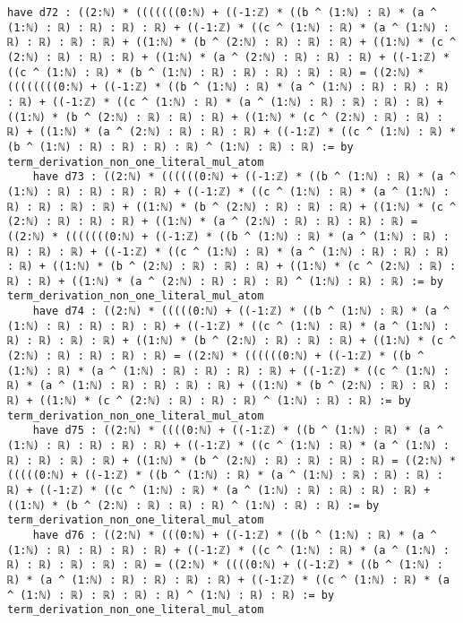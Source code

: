 \documentclass{article}
\begin{document}
\begin{tcolorbox}[colback=white!10, width=\linewidth]
\begin{lstlisting}[language=Lean4]
    have d72 : ((2:ℕ) * (((((((0:ℕ) + ((-1:ℤ) * ((b ^ (1:ℕ) : ℝ) * (a ^ (1:ℕ) : ℝ) : ℝ) : ℝ) : ℝ) + ((-1:ℤ) * ((c ^ (1:ℕ) : ℝ) * (a ^ (1:ℕ) : ℝ) : ℝ) : ℝ) : ℝ) + ((1:ℕ) * (b ^ (2:ℕ) : ℝ) : ℝ) : ℝ) + ((1:ℕ) * (c ^ (2:ℕ) : ℝ) : ℝ) : ℝ) + ((1:ℕ) * (a ^ (2:ℕ) : ℝ) : ℝ) : ℝ) + ((-1:ℤ) * ((c ^ (1:ℕ) : ℝ) * (b ^ (1:ℕ) : ℝ) : ℝ) : ℝ) : ℝ) : ℝ) = ((2:ℕ) * ((((((((0:ℕ) + ((-1:ℤ) * ((b ^ (1:ℕ) : ℝ) * (a ^ (1:ℕ) : ℝ) : ℝ) : ℝ) : ℝ) + ((-1:ℤ) * ((c ^ (1:ℕ) : ℝ) * (a ^ (1:ℕ) : ℝ) : ℝ) : ℝ) : ℝ) + ((1:ℕ) * (b ^ (2:ℕ) : ℝ) : ℝ) : ℝ) + ((1:ℕ) * (c ^ (2:ℕ) : ℝ) : ℝ) : ℝ) + ((1:ℕ) * (a ^ (2:ℕ) : ℝ) : ℝ) : ℝ) + ((-1:ℤ) * ((c ^ (1:ℕ) : ℝ) * (b ^ (1:ℕ) : ℝ) : ℝ) : ℝ) : ℝ) ^ (1:ℕ) : ℝ) : ℝ) := by term_derivation_non_one_literal_mul_atom
    have d73 : ((2:ℕ) * ((((((0:ℕ) + ((-1:ℤ) * ((b ^ (1:ℕ) : ℝ) * (a ^ (1:ℕ) : ℝ) : ℝ) : ℝ) : ℝ) + ((-1:ℤ) * ((c ^ (1:ℕ) : ℝ) * (a ^ (1:ℕ) : ℝ) : ℝ) : ℝ) : ℝ) + ((1:ℕ) * (b ^ (2:ℕ) : ℝ) : ℝ) : ℝ) + ((1:ℕ) * (c ^ (2:ℕ) : ℝ) : ℝ) : ℝ) + ((1:ℕ) * (a ^ (2:ℕ) : ℝ) : ℝ) : ℝ) : ℝ) = ((2:ℕ) * (((((((0:ℕ) + ((-1:ℤ) * ((b ^ (1:ℕ) : ℝ) * (a ^ (1:ℕ) : ℝ) : ℝ) : ℝ) : ℝ) + ((-1:ℤ) * ((c ^ (1:ℕ) : ℝ) * (a ^ (1:ℕ) : ℝ) : ℝ) : ℝ) : ℝ) + ((1:ℕ) * (b ^ (2:ℕ) : ℝ) : ℝ) : ℝ) + ((1:ℕ) * (c ^ (2:ℕ) : ℝ) : ℝ) : ℝ) + ((1:ℕ) * (a ^ (2:ℕ) : ℝ) : ℝ) : ℝ) ^ (1:ℕ) : ℝ) : ℝ) := by term_derivation_non_one_literal_mul_atom
    have d74 : ((2:ℕ) * (((((0:ℕ) + ((-1:ℤ) * ((b ^ (1:ℕ) : ℝ) * (a ^ (1:ℕ) : ℝ) : ℝ) : ℝ) : ℝ) + ((-1:ℤ) * ((c ^ (1:ℕ) : ℝ) * (a ^ (1:ℕ) : ℝ) : ℝ) : ℝ) : ℝ) + ((1:ℕ) * (b ^ (2:ℕ) : ℝ) : ℝ) : ℝ) + ((1:ℕ) * (c ^ (2:ℕ) : ℝ) : ℝ) : ℝ) : ℝ) = ((2:ℕ) * ((((((0:ℕ) + ((-1:ℤ) * ((b ^ (1:ℕ) : ℝ) * (a ^ (1:ℕ) : ℝ) : ℝ) : ℝ) : ℝ) + ((-1:ℤ) * ((c ^ (1:ℕ) : ℝ) * (a ^ (1:ℕ) : ℝ) : ℝ) : ℝ) : ℝ) + ((1:ℕ) * (b ^ (2:ℕ) : ℝ) : ℝ) : ℝ) + ((1:ℕ) * (c ^ (2:ℕ) : ℝ) : ℝ) : ℝ) ^ (1:ℕ) : ℝ) : ℝ) := by term_derivation_non_one_literal_mul_atom
    have d75 : ((2:ℕ) * ((((0:ℕ) + ((-1:ℤ) * ((b ^ (1:ℕ) : ℝ) * (a ^ (1:ℕ) : ℝ) : ℝ) : ℝ) : ℝ) + ((-1:ℤ) * ((c ^ (1:ℕ) : ℝ) * (a ^ (1:ℕ) : ℝ) : ℝ) : ℝ) : ℝ) + ((1:ℕ) * (b ^ (2:ℕ) : ℝ) : ℝ) : ℝ) : ℝ) = ((2:ℕ) * (((((0:ℕ) + ((-1:ℤ) * ((b ^ (1:ℕ) : ℝ) * (a ^ (1:ℕ) : ℝ) : ℝ) : ℝ) : ℝ) + ((-1:ℤ) * ((c ^ (1:ℕ) : ℝ) * (a ^ (1:ℕ) : ℝ) : ℝ) : ℝ) : ℝ) + ((1:ℕ) * (b ^ (2:ℕ) : ℝ) : ℝ) : ℝ) ^ (1:ℕ) : ℝ) : ℝ) := by term_derivation_non_one_literal_mul_atom
    have d76 : ((2:ℕ) * (((0:ℕ) + ((-1:ℤ) * ((b ^ (1:ℕ) : ℝ) * (a ^ (1:ℕ) : ℝ) : ℝ) : ℝ) : ℝ) + ((-1:ℤ) * ((c ^ (1:ℕ) : ℝ) * (a ^ (1:ℕ) : ℝ) : ℝ) : ℝ) : ℝ) : ℝ) = ((2:ℕ) * ((((0:ℕ) + ((-1:ℤ) * ((b ^ (1:ℕ) : ℝ) * (a ^ (1:ℕ) : ℝ) : ℝ) : ℝ) : ℝ) + ((-1:ℤ) * ((c ^ (1:ℕ) : ℝ) * (a ^ (1:ℕ) : ℝ) : ℝ) : ℝ) : ℝ) ^ (1:ℕ) : ℝ) : ℝ) := by term_derivation_non_one_literal_mul_atom

\end{lstlisting}
\end{tcolorbox}
\end{document}
